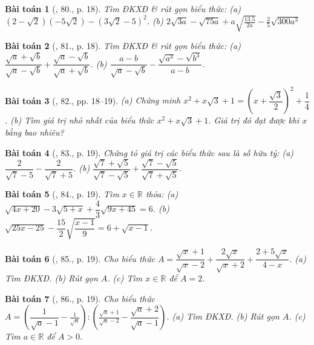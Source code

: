 \documentclass{article}
\newtheorem{baitoan}{Bài toán}
\begin{document}
\begin{baitoan}[\cite{SBT_Toan_9_tap_1}, 80., p. 18]
	Tìm ĐKXĐ \& rút gọn biểu thức: (a) $(2 - \sqrt{2})(-5\sqrt{2}) - (3\sqrt{2} - 5)^2$. (b) $2\sqrt{3a} - \sqrt{75a} + a\sqrt{\frac{13.5}{2a}} - \frac{2}{5}\sqrt{300a^3}$
\end{baitoan}

\begin{baitoan}[\cite{SBT_Toan_9_tap_1}, 81., p. 18]
	Tìm ĐKXĐ \& rút gọn biểu thức: (a) $\dfrac{\sqrt{a} + \sqrt{b}}{\sqrt{a} - \sqrt{b}} + \dfrac{\sqrt{a} - \sqrt{b}}{\sqrt{a} + \sqrt{b}}$. (b) $\dfrac{a - b}{\sqrt{a} - \sqrt{b}} - \dfrac{\sqrt{a^3} - \sqrt{b^3}}{a - b}$.
\end{baitoan}

\begin{baitoan}[\cite{SBT_Toan_9_tap_1}, 82., pp. 18--19]
	(a) Chứng minh $x^2 + x\sqrt{3} + 1 = \left(x + \dfrac{\sqrt{3}}{2}\right)^2 + \dfrac{1}{4}$. (b) Tìm giá trị nhỏ nhất của biểu thức $x^2 + x\sqrt{3} + 1$. Giá trị đó đạt được khi $x$ bằng bao nhiêu?
\end{baitoan}

\begin{baitoan}[\cite{SBT_Toan_9_tap_1}, 83., p. 19]
	Chứng tỏ giá trị các biểu thức sau là số hữu tỷ: (a) $\dfrac{2}{\sqrt{7} - 5} - \dfrac{2}{\sqrt{7} + 5}$. (b) $\dfrac{\sqrt{7} + \sqrt{5}}{\sqrt{7} - \sqrt{5}} + \dfrac{\sqrt{7} - \sqrt{5}}{\sqrt{7} + \sqrt{5}}$.
\end{baitoan}

\begin{baitoan}[\cite{SBT_Toan_9_tap_1}, 84., p. 19]
	Tìm $x\in\mathbb{R}$ thỏa: (a) $\sqrt{4x + 20} - 3\sqrt{5 + x} + \dfrac{4}{3}\sqrt{9x + 45} = 6$. (b) $\sqrt{25x - 25} - \dfrac{15}{2}\sqrt{\dfrac{x - 1}{9}} = 6 + \sqrt{x - 1}$.
\end{baitoan}

\begin{baitoan}[\cite{SBT_Toan_9_tap_1}, 85., p. 19]
	Cho biểu thức $A = \dfrac{\sqrt{x} + 1}{\sqrt{x} - 2} + \dfrac{2\sqrt{x}}{\sqrt{x} + 2} + \dfrac{2 + 5\sqrt{x}}{4 - x}$. (a) Tìm ĐKXĐ. (b) Rút gọn $A$. (c) Tìm $x\in\mathbb{R}$ để $A = 2$. 
\end{baitoan}

\begin{baitoan}[\cite{SBT_Toan_9_tap_1}, 86., p. 19]
	Cho biểu thức $A = \left(\dfrac{1}{\sqrt{a} - 1} - \frac{1}{\sqrt{a}}\right):\left(\frac{\sqrt{a} + 1}{\sqrt{a} - 2} - \dfrac{\sqrt{a} + 2}{\sqrt{a} - 1}\right)$. (a) Tìm ĐKXĐ. (b) Rút gọn $A$. (c) Tìm $a\in\mathbb{R}$ để $A > 0$.
\end{baitoan}
\end{document}
